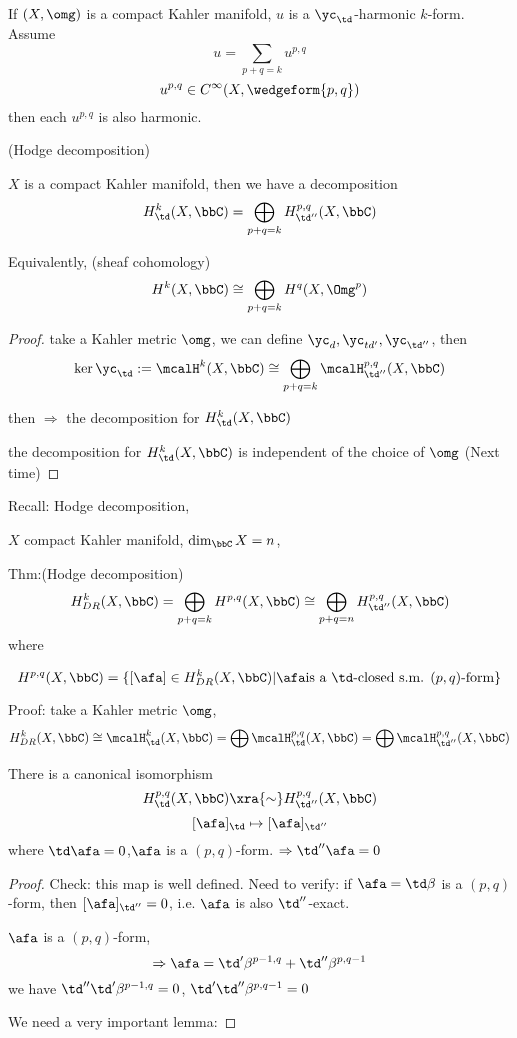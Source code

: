 \begin{cor}
If $(X,\omg)$ is a compact Kahler manifold,
$u$ is a $\yc_\td$-harmonic $k$-form. Assume
$$u=\sum_{p+q=k}u^{p,q}$$
$$u^{p,q}\in C^\infty(X,\wedgeform{p,q})$$
then each $u^{p,q}$ is also harmonic.
\end{cor}

\begin{thm}(Hodge decomposition)

$X$ is a compact Kahler manifold, then we have a decomposition
$$H_{\td}^k(X,\bbC)=\bigoplus_{p+q=k}H^{p,q}_{\td''}(X,\bbC)$$

Equivalently, (sheaf cohomology)
$$H^k(X,\bbC)\cong\bigoplus_{p+q=k}H^q(X,\Omg^p)$$
\end{thm}
\begin{proof}
take a Kahler metric $\omg$, we can define $\yc_d,\yc_{td'},\yc_{\td''}$,
then
$$\ker\yc_{\td}:=\mcalH^k(X,\bbC)
\cong\bigoplus\limits_{p+q=k}\mcalH^{p,q}_{\td''}(X,\bbC)$$

then $\Longrightarrow$ the decomposition for $H_\td^k(X,\bbC)$

the decomposition for $H^k_\td(X,\bbC)$ is independent of the choice of $\omg$
(Next time)
\end{proof}


Recall: Hodge decomposition, 

$X$ compact Kahler manifold, $\dim_\bbC X=n$, 

Thm:(Hodge decomposition)
$$H^k_{DR}(X,\bbC)=\bigoplus_{p+q=k}H^{p,q}(X,\bbC)
\cong\bigoplus_{p+q=n}H^{p,q}_{\td''}(X,\bbC)$$
where

$$H^{p,q}(X,\bbC)=\{[\afa]\in H_{DR}^k(X,\bbC)|\afa\text{is a $\td$-closed s.m. $(p,q)$-form}\}$$

Proof: take a Kahler metric $\omg$, 
$$
H^k_{DR}(X,\bbC)
\cong
\mcalH_{\td}^k(X,\bbC)=\bigoplus\mcalH_\td^{p,q}(X,\bbC)
=\bigoplus\mcalH_{\td''}^{p,q}(X,\bbC)$$

\begin{prop}There is a canonical isomorphism
$$H^{p,q}_{\td}(X,\bbC)\xra{\sim}H^{p,q}_{\td''}(X,\bbC)$$
$$[\afa]_{\td}\mapsto[\afa]_{\td''}$$
where $\td\afa=0$,$\afa$ is a $(p,q)$-form.
$\Rightarrow \td''\afa=0$
\end{prop}
\begin{proof}
  Check: this map is well defined. Need to verify:
if $\afa=\td\beta$ is a $(p,q)$-form, then $[\afa]_{\td''}=0$,
i.e. $\afa$ is also $\td''$-exact.

$\afa$ is a $(p,q)$-form, 
$$\Rightarrow\afa=\td'\beta^{p-1,q}+\td''\beta^{p,q-1}$$
we have $\td''\td'\beta^{p-1,q}=0$, $\td'\td''\beta^{p,q-1}=0$

We need a very important lemma:
\end{proof}

